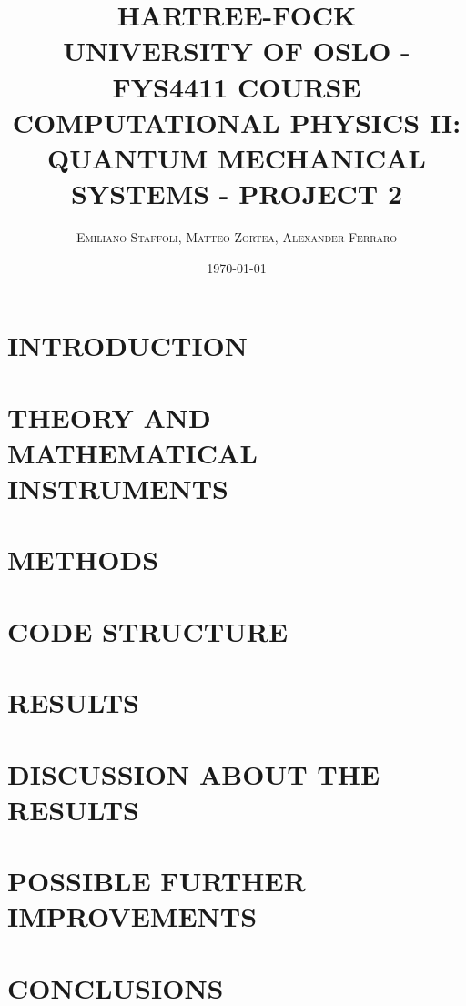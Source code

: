 \documentclass[a4paper, twocolumn]{article}
\title{\LARGE HARTREE-FOCK \\ \vspace{4mm}  \large UNIVERSITY OF OSLO - FYS4411 COURSE \\ \large COMPUTATIONAL PHYSICS II: QUANTUM MECHANICAL SYSTEMS - PROJECT 2 }
\author{\textsc{Emiliano Staffoli, Matteo Zortea, Alexander Ferraro} }
\date{\today}
\begin{document}
\setcounter{page}{1}

\twocolumn[{
\maketitle

\vspace{12mm}
}]


\section{INTRODUCTION}
\label{sec:introduction}
   


\section{THEORY AND MATHEMATICAL INSTRUMENTS}
\label{sec:theory}
    
   
\section{METHODS}
\label{sec:methods}
    
    
\section{CODE STRUCTURE}
\label{sec:code}



\section{RESULTS}
\label{sec:results}


\section{DISCUSSION ABOUT THE RESULTS}
\label{sec:discussion}


\section{POSSIBLE FURTHER IMPROVEMENTS}
\label{sec:improvements}


\section{CONCLUSIONS}
\label{sec:conclusions}

\end{document}
